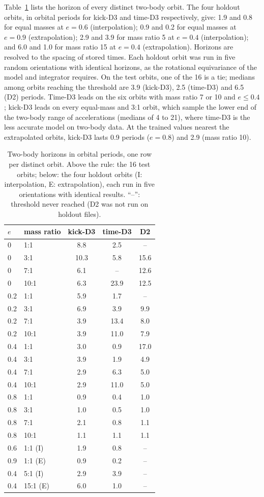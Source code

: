 \documentclass[a4paper,journal]{IEEEtran}
\begin{document}
Table~\ref{tab:twobody} lists the horizon of every distinct two-body orbit. The four holdout orbits, in orbital periods for kick-D3 and time-D3 respectively, give: 1.9 and 0.8 for equal masses at $e=0.6$ (interpolation); 0.9 and 0.2 for equal masses at $e=0.9$ (extrapolation); 2.9 and 3.9 for mass ratio 5 at $e=0.4$ (interpolation); and 6.0 and 1.0 for mass ratio 15 at $e=0.4$ (extrapolation). Horizons are resolved to the spacing of stored times. Each holdout orbit was run in five random orientations with identical horizons, as the rotational equivariance of the model and integrator requires. On the test orbits, one of the 16 is a tie; medians among orbits reaching the threshold are 3.9 (kick-D3), 2.5 (time-D3) and 6.5 (D2) periods. Time-D3 leads on the six orbits with mass ratio 7 or 10 and $e\le0.4$; kick-D3 leads on every equal-mass and 3:1 orbit, which sample the lower end of the two-body range of accelerations (medians of 4 to 21), where time-D3 is the less accurate model on two-body data. At the trained values nearest the extrapolated orbits, kick-D3 lasts 0.9 periods ($e=0.8$) and 2.9 (mass ratio 10).

\begin{table}[t]
\caption{Two-body horizons in orbital periods, one row per distinct orbit. Above the rule: the 16 test orbits; below: the four holdout orbits (I: interpolation, E: extrapolation), each run in five orientations with identical results. ``--'': threshold never reached (D2 was not run on holdout files).}
\label{tab:twobody}
\centering
\small
\begin{tabular}{llccc}
\toprule
$e$ & mass ratio & kick-D3 & time-D3 & D2\\
\midrule
0 & 1:1 & 8.8 & 2.5 & --\\
0 & 3:1 & 10.3 & 5.8 & 15.6\\
0 & 7:1 & 6.1 & -- & 12.6\\
0 & 10:1 & 6.3 & 23.9 & 12.5\\
0.2 & 1:1 & 5.9 & 1.7 & --\\
0.2 & 3:1 & 6.9 & 3.9 & 9.9\\
0.2 & 7:1 & 3.9 & 13.4 & 8.0\\
0.2 & 10:1 & 3.9 & 11.0 & 7.9\\
0.4 & 1:1 & 3.0 & 0.9 & 17.0\\
0.4 & 3:1 & 3.9 & 1.9 & 4.9\\
0.4 & 7:1 & 2.9 & 6.3 & 5.0\\
0.4 & 10:1 & 2.9 & 11.0 & 5.0\\
0.8 & 1:1 & 0.9 & 0.4 & 1.0\\
0.8 & 3:1 & 1.0 & 0.5 & 1.0\\
0.8 & 7:1 & 2.1 & 0.8 & 1.1\\
0.8 & 10:1 & 1.1 & 1.1 & 1.1\\
\midrule
0.6 & 1:1 (I) & 1.9 & 0.8 & --\\
0.9 & 1:1 (E) & 0.9 & 0.2 & --\\
0.4 & 5:1 (I) & 2.9 & 3.9 & --\\
0.4 & 15:1 (E) & 6.0 & 1.0 & --\\
\bottomrule
\end{tabular}
\end{table}
\end{document}
